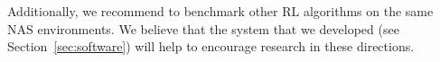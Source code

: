 Additionally, we recommend to benchmark other RL algorithms on the same NAS environments. We believe that the system that we developed (see Section~\ref{sec:software}) will help to encourage research in these directions.



    
